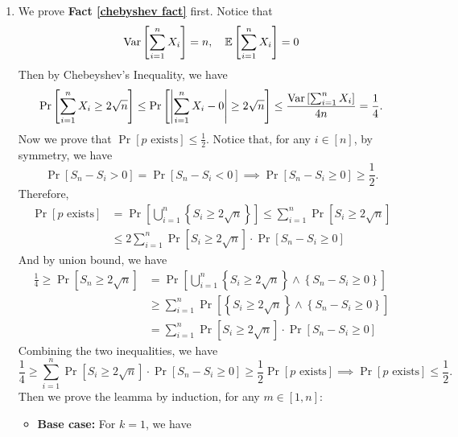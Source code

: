 \begin{answer}
    \begin{enumerate}[label=\alph*).]
        \item We prove \textbf{Fact \ref{chebyshev fact}} first. Notice that 
        \[
            \mathrm{Var}\left[\sum_{i=1}^{n} X_i\right] = n, \quad \mathbb{E}\left[\sum_{i=1}^{n}X_i\right] = 0
        \] 
        Then by Chebeyshev's Inequality, we have
        \begin{align*}
            \Pr\left[\sum_{i=1}^{n}X_i \ge 2\sqrt{n}\right] \le \Pr\left[\left|\sum_{i=1}^{n}X_i - 0\right|\ge 2\sqrt{n}\right] \le \frac{\mathrm{Var}\left[\sum_{i=1}^{n}X_i\right]}{4n} = \frac{1}{4}.
        \end{align*}
        Now we prove that $\Pr[\text{$p$ exists}] \le \frac{1}{2}$. Notice that, for any $i \in [n]$, by symmetry, we have
        \[
            \Pr\left[S_n - S_i > 0\right] = \Pr\left[S_n - S_i < 0\right] \implies \Pr\left[S_n - S_i \ge 0\right] \ge \frac{1}{2}. 
        \]
        Therefore, 
        \begin{align*}
            \Pr[p \text{ exists}] &= \Pr\left[\bigcup_{i=1}^{n} \left\{S_i \ge 2\sqrt{n}\right\}\right] \le \sum_{i=1}^{n} \Pr\left[S_i \ge 2\sqrt{n}\right] \\
            &\le 2 \sum_{i=1}^{n} \Pr\left[S_i \ge 2\sqrt{n}\right] \cdot \Pr[S_n - S_i \ge 0] 
        \end{align*}
        And by union bound, we have
        \begin{align*}
            \frac{1}{4} \ge \Pr\left[S_n \ge 2\sqrt{n}\right] &= \Pr\left[\bigcup_{i=1}^{n}\left\{S_i \ge 2\sqrt{n}\right\} \land \left\{S_n - S_i \ge 0\right\} \right] \\
            &\ge \sum_{i=1}^{n} \Pr\left[\left\{S_i \ge 2\sqrt{n}\right\} \land \left\{S_n - S_i \ge 0\right\}\right] \\
            &= \sum_{i=1}^{n} \Pr\left[S_i \ge 2\sqrt{n}\right] \cdot \Pr[S_n - S_i \ge 0] 
        \end{align*}
        Combining the two inequalities, we have
        \[
            \frac{1}{4} \ge  \sum_{i=1}^{n} \Pr\left[S_i \ge 2\sqrt{n}\right] \cdot \Pr[S_n - S_i \ge 0] \ge \frac{1}{2} \Pr[\text{$p$ exists}] \implies \Pr[\text{$p$ exists}] \le \frac{1}{2}.
        \]
        Then we prove the leamma by induction, for any $m \in [1,n]$: 
        \begin{itemize}
            \item \textbf{Base case:} For $k=1$, we have
            \begin{align*}

\end{align*}
\end{itemize}
\end{enumerate}
\end{answer}
